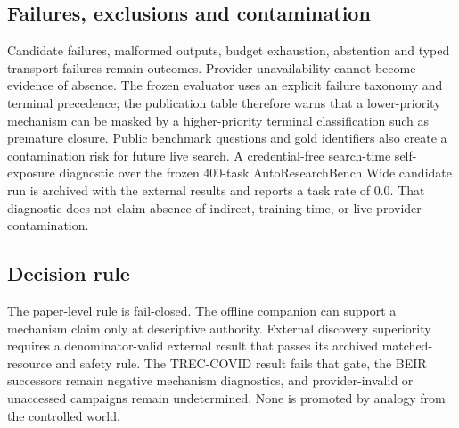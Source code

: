 \subsection{Failures, exclusions and contamination}
Candidate failures, malformed outputs, budget exhaustion, abstention and typed
transport failures remain outcomes.  Provider unavailability cannot become
evidence of absence.  The frozen evaluator uses an explicit failure taxonomy and
terminal precedence; the publication table therefore warns that a lower-priority
mechanism can be masked by a higher-priority terminal classification such as
premature closure.  Public benchmark questions and gold identifiers also create
a contamination risk for future live search.  A credential-free search-time
self-exposure diagnostic over the frozen 400-task AutoResearchBench Wide
candidate run is archived with the external results and reports a task rate of
0.0.  That diagnostic does not claim absence of indirect, training-time, or
live-provider contamination.

\subsection{Decision rule}
The paper-level rule is fail-closed. The offline companion can support a
mechanism claim only at descriptive authority. External discovery superiority
requires a denominator-valid external result that passes its archived
matched-resource and safety rule. The TREC-COVID result fails that gate, the
BEIR successors remain negative mechanism diagnostics, and provider-invalid or
unaccessed campaigns remain undetermined. None is promoted by analogy from the
controlled world.

